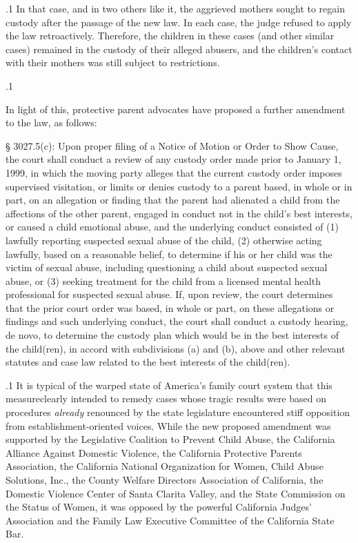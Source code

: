 \documentclass[11pt, twoside]{article}
\begin{document}
{\p.1{%
In that case, and in two others like it, the aggrieved mothers sought to
regain custody after the passage of the new law. In each case, the judge
refused to apply the law retroactively. Therefore, the children in these
cases (and other similar cases) remained in the custody of their alleged
abusers, and the children’s contact with their mothers was still subject
to restrictions.
}%

\p.1{%
In light of this, protective parent advocates have proposed a further
amendment to the law, as follows:

\begin{blockQuote}
§ 3027.5(c): Upon proper filing of a Notice of Motion or Order to
Show Cause, the court shall conduct a review of any custody order
made prior to January 1, 1999, in which the moving party alleges
that the current custody order imposes supervised visitation, or
limits or denies custody to a parent based, in whole or in part, on
an allegation or finding that the parent had alienated a child from
the affections of the other parent, engaged in conduct not in the
child’s best interests, or caused a child emotional abuse, and the
underlying conduct consisted of (1) lawfully reporting suspected
sexual abuse of the child, (2) otherwise acting lawfully, based on
a reasonable belief, to determine if his or her child was the victim of sexual abuse, including questioning a child about suspected
sexual abuse, or (3) seeking treatment for the child from a licensed
mental health professional for suspected sexual abuse. If, upon review, the court determines that the prior court order was based, in
whole or part, on these allegations or findings and such underlying
conduct, the court shall conduct a custody hearing, de novo, to determine the custody plan which would be in the best interests of the
child(ren), in accord with subdivisions (a) and (b), above and other
relevant statutes and case law related to the best interests of the
child(ren).
\end{blockQuote}

}%

\p.1{%
It is typical of the warped state of America’s family court system that
this measure\mdash{}clearly intended to remedy cases whose tragic results
were based on procedures \textit{already} renounced by the state legislature\mdash{}
encountered stiff opposition from establishment-oriented voices. While
the new proposed amendment was supported by the Legislative Coalition to Prevent Child Abuse, the California Alliance Against Domestic
Violence, the California Protective Parents Association, the California
National Organization for Women, Child Abuse Solutions, Inc., the
County Welfare Directors Association of California, the Domestic Violence Center of Santa Clarita Valley, and the State Commission on the
Status of Women, it was opposed by the powerful California Judges’ Association and the Family Law Executive Committee of the California
State Bar.
}%

}
\end{document}
